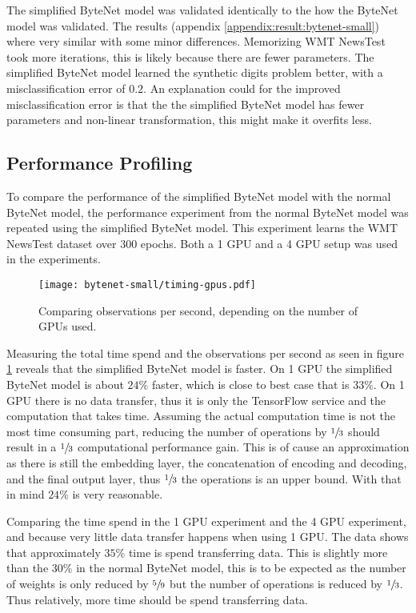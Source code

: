 The simplified ByteNet model was validated identically to the how the ByteNet model was validated. The results (appendix \ref{appendix:result:bytenet-small}) where very similar with some minor differences. Memorizing WMT NewsTest took more iterations, this is likely because there are fewer parameters. The simplified ByteNet model learned the synthetic digits problem better, with a misclassification error of $0.2$. An explanation could for the improved misclassification error is that the the simplified ByteNet model has fewer parameters and non-linear transformation, this might make it overfits less.

\subsection{Performance Profiling}

To compare the performance of the simplified ByteNet model with the normal ByteNet model, the performance experiment from the normal ByteNet model was repeated using the simplified ByteNet model. This experiment learns the WMT NewsTest dataset over 300 epochs. Both a 1 GPU and a 4 GPU setup was used in the experiments.

\begin{figure}[h]
    \centering
    \texttt{[image: bytenet-small/timing-gpus.pdf]}
    \caption{Comparing observations per second, depending on the number of GPUs used.}
    \label{fig:result:simple-bytenet:timing-gpus}
\end{figure}

Measuring the total time spend and the observations per second as seen in figure \ref{fig:result:simple-bytenet:timing-gpus} reveals that the simplified ByteNet model is faster. On 1 GPU the simplified ByteNet model is about $24\%$ faster, which is close to best case that is $33\%$. On 1 GPU there is no data transfer, thus it is only the TensorFlow service and the computation that takes time. Assuming the actual computation time is not the most time consuming part, reducing the number of operations by $\sfrac{1}{3}$ should result in a $\sfrac{1}{3}$ computational performance gain. This is of cause an approximation as there is still the embedding layer, the concatenation of encoding and decoding, and the final output layer, thus $\sfrac{1}{3}$ the operations is an upper bound. With that in mind $24\%$ is very reasonable.

Comparing the time spend in the 1 GPU experiment and the 4 GPU experiment, and because very little data transfer happens when using 1 GPU. The data shows that approximately $35\%$ time is spend transferring data. This is slightly more than the $30\%$ in the normal ByteNet model, this is to be expected as the number of weights is only reduced by $\sfrac{5}{9}$ but the number of operations is reduced by $\sfrac{1}{3}$. Thus relatively, more time should be spend transferring data.

